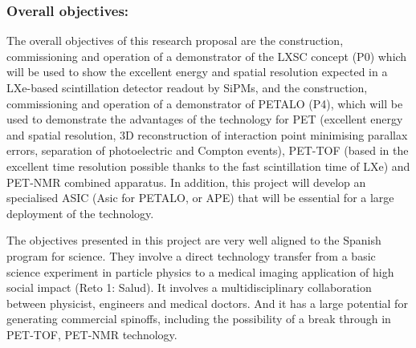 \subsubsection*{Overall objectives:}
The overall objectives of this research proposal are the construction, commissioning and operation of a demonstrator of the LXSC concept (P0) which will be used to show the excellent energy and spatial resolution expected in a LXe-based scintillation detector readout by SiPMs, and the construction, commissioning and operation of a demonstrator of PETALO (P4), which will be used to demonstrate the advantages of the technology for PET (excellent energy and spatial resolution, 3D reconstruction of interaction point minimising parallax errors, separation of photoelectric and Compton events), PET-TOF (based in the excellent time resolution possible thanks to the fast scintillation time of LXe) and PET-NMR combined apparatus. In addition, this project will develop an specialised ASIC (Asic for PETALO, or APE) that will be essential for a large deployment of the technology. 


The objectives presented in this project are very well aligned to the Spanish program for science. They involve a direct technology transfer from a basic science experiment in particle physics to a medical imaging application of high social impact (Reto 1: Salud). It involves a multidisciplinary collaboration between physicist, engineers and medical doctors. And it has a large potential for generating commercial spinoffs, including the possibility of a break through in  PET-TOF, PET-NMR technology.  
